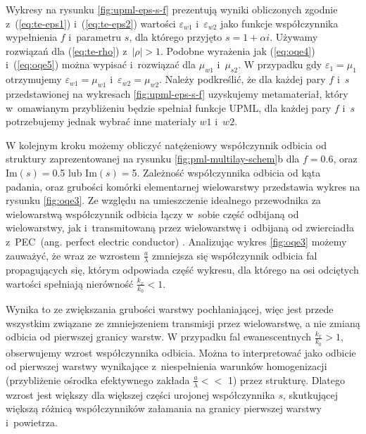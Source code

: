 Wykresy na rysunku \ref{fig:upml-eps-s-f} prezentują wyniki obliczonych zgodnie z~(\ref{eq:te-eps1}) i~(\ref{eq:te-eps2}) wartości $\varepsilon_{w1}$ i~$\varepsilon_{w2}$ jako funkcje współczynnika wypełnienia $f$ i~parametru $s$, dla którego przyjęto $s=1+\alpha i$. Używamy rozwiązań dla (\ref{eq:te-rho}) z~$|\rho|>1$. Podobne wyrażenia jak (\ref{eq:oqe4}) i~(\ref{eq:oqe5}) można wypisać i~rozwiązać dla $\mu_{w1}$ i~$\mu_{s2}$. W przypadku gdy $\varepsilon_1=\mu_1$ otrzymujemy $\varepsilon_{w1}=\mu_{w1}$ i~$\varepsilon_{w2}=\mu_{w2}$. Należy podkreślić, że dla każdej pary $f$ i~$s$ przedstawionej na wykresach \ref{fig:upml-eps-s-f} uzyskujemy metamateriał, który w~omawianym przybliżeniu będzie spełniał funkcje UPML, dla każdej pary $f$ i~$s$ potrzebujemy jednak wybrać inne materiały $w1$ i~$w2$.

W kolejnym kroku możemy obliczyć natężeniowy współczynnik odbicia od struktury zaprezentowanej na rysunku \ref{fig:pml-multilay-schem}b dla $f=0.6$, oraz $\textrm{Im}(s)=$0.5 lub $\textrm{Im}(s)=$5. Zależność współczynnika odbicia od kąta padania, oraz grubości komórki elementarnej wielowarstwy przedstawia wykres na rysunku \ref{fig:oqe3}. Ze względu na umieszczenie idealnego przewodnika za wielowarstwą współczynnik odbicia łączy w~sobie część odbijaną od wielowarstwy, jak i~transmitowaną przez wielowarstwę i~odbijaną od zwierciadła z~PEC~(ang. perfect electric conductor) . Analizując wykres \ref{fig:oqe3} możemy zauważyć, że wraz ze wzrostem $\frac{a}{\lambda}$ zmniejsza się współczynnik odbicia fal propagujących się, którym odpowiada część wykresu, dla którego na osi odciętych wartości spełniają nierówność $\frac{k_x}{k_0}<1$.

Wynika to ze zwiększania grubości warstwy pochłaniającej, więc jest przede wszystkim związane ze zmniejszeniem transmisji przez wielowarstwę, a nie zmianą odbicia od pierwszej granicy warstw. W przypadku fal ewanescentnych $\frac{k_x}{k_0}>1$, obserwujemy wzrost współczynnika odbicia. Można to interpretować jako odbicie od pierwszej warstwy wynikające z~niespełnienia warunków homogenizacji (przybliżenie ośrodka efektywnego zakłada $\frac{a}{\lambda} <<$ 1) przez strukturę. Dlatego wzrost jest większy dla większej części urojonej współczynnika $s$, skutkującej większą różnicą współczynników załamania na granicy pierwszej warstwy i~powietrza.


